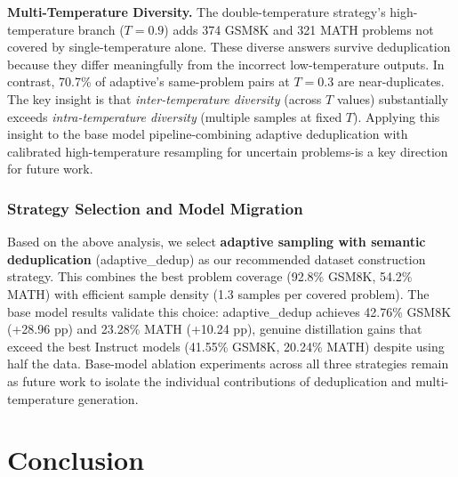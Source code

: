 \documentclass{article}
\begin{document}
\textbf{Multi-Temperature Diversity.} The double-temperature strategy's high-temperature branch ($T = 0.9$) adds 374 GSM8K and 321 MATH problems not covered by single-temperature alone. These diverse answers survive deduplication because they differ meaningfully from the incorrect low-temperature outputs. In contrast, 70.7\% of adaptive's same-problem pairs at $T = 0.3$ are near-duplicates. The key insight is that \textit{inter-temperature diversity} (across $T$ values) substantially exceeds \textit{intra-temperature diversity} (multiple samples at fixed $T$). Applying this insight to the base model pipeline-combining adaptive deduplication with calibrated high-temperature resampling for uncertain problems-is a key direction for future work.

\subsubsection{Strategy Selection and Model Migration}

Based on the above analysis, we select \textbf{adaptive sampling with semantic deduplication} (adaptive\_dedup) as our recommended dataset construction strategy. This combines the best problem coverage (92.8\% GSM8K, 54.2\% MATH) with efficient sample density (1.3 samples per covered problem). The base model results validate this choice: adaptive\_dedup achieves 42.76\% GSM8K (+28.96 pp) and 23.28\% MATH (+10.24 pp), genuine distillation gains that exceed the best Instruct models (41.55\% GSM8K, 20.24\% MATH) despite using half the data. Base-model ablation experiments across all three strategies remain as future work to isolate the individual contributions of deduplication and multi-temperature generation.


\section{Conclusion}
\end{document}
